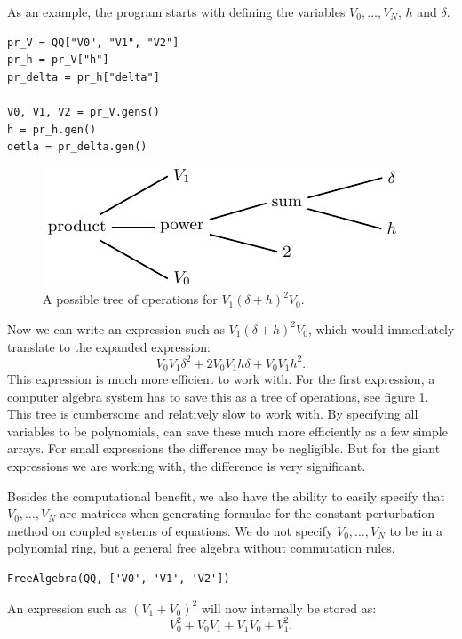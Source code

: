 As an example, the \sage{} program starts with defining the variables $V_0, \dots, V_N$, $h$ and $\delta$.
\begin{verbatim}
pr_V = QQ["V0", "V1", "V2"]
pr_h = pr_V["h"]
pr_delta = pr_h["delta"]

V0, V1, V2 = pr_V.gens()
h = pr_h.gen()
detla = pr_delta.gen()
\end{verbatim}

\begin{figure}
    \begin{center}
        \includegraphics{img/chapter2/sage_operations/tree.pdf}
    \end{center}
    \caption{A possible tree of operations for $V_1 (\delta+h)^2 V_0$.}\label{fig:c2_operations_tree}
\end{figure}

Now we can write an expression such as $V_1 (\delta + h)^2 V_0$, which \sage{} would immediately translate to the expanded expression:
$$
    V_{0} V_{1} \delta^{2} + 2 V_{0} V_{1} h \delta + V_{0} V_{1} h^{2}\text{.}
$$
This expression is much more efficient to work with. For the first expression, a computer algebra system has to save this as a tree of operations, see figure \ref{fig:c2_operations_tree}. This tree is cumbersome and relatively slow to work with. By specifying all variables to be polynomials, \sage{} can save these much more efficiently as a few simple arrays. For small expressions the difference may be negligible. But for the giant expressions we are working with, the difference is very significant.

Besides the computational benefit, we also have the ability to easily specify that $V_0, \dots, V_N$ are matrices when generating formulae for the constant perturbation method on coupled systems of equations. We do not specify $V_0, \dots, V_N$ to be in a polynomial ring, but a general free algebra without commutation rules.
\begin{verbatim}
FreeAlgebra(QQ, ['V0', 'V1', 'V2'])
\end{verbatim}
An expression such as $(V_1 + V_0)^2$ will now internally be stored as:
$$
    V_{0}^{2} + V_{0} V_{1} + V_{1} V_{0} + V_{1}^{2}\text{.}
$$

